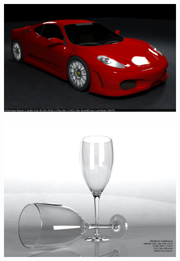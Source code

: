 \documentclass[11pt,a4paper]{article}
\begin{document}
\begin{figure}[H]
 \begin{subfigure}{0.47\textwidth}
 \centering
 \vspace{1em}
  \includegraphics[width=\textwidth]{images/ferrari1440x900.jpg}
 \end{subfigure}
 \begin{subfigure}{0.47\textwidth}
 \centering
  \includegraphics[width=\textwidth]{images/glass03.jpg}
 \end{subfigure}
 

\end{figure}
\end{document}
